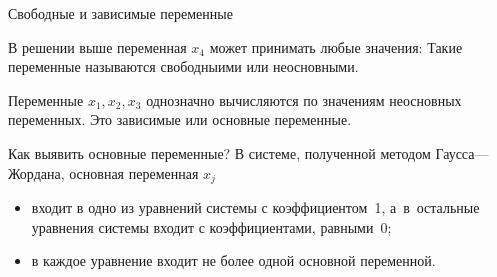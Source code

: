 \documentclass[unicode,11pt,notheorems]{beamer}
\begin{document}
\begin{frame}{Свободные и зависимые переменные}

В решении выше  переменная $ x_4$ может принимать любые значения:
Такие переменные называются \alert{свободныими} или \alert{неосновными}.

\medskip
Переменные $x_1,x_2, x_3$  однозначно вычисляются по значениям неосновных переменных. Это \alert{зависимые} или \alert{основные} переменные.


\begin{block}{Как выявить основные переменные?}
	В системе, полученной методом Гаусса---Жордана, основная переменная  $x_j$
	\begin{itemize}
	\item 
 входит в одно из уравнений системы с коэффициентом~1, а~в~остальные уравнения системы входит с коэффициентами, равными~0;
 \item 
 	в каждое уравнение входит не более одной основной переменной.
 	 \end{itemize}
\end{block}
\end{frame}
\end{document}
